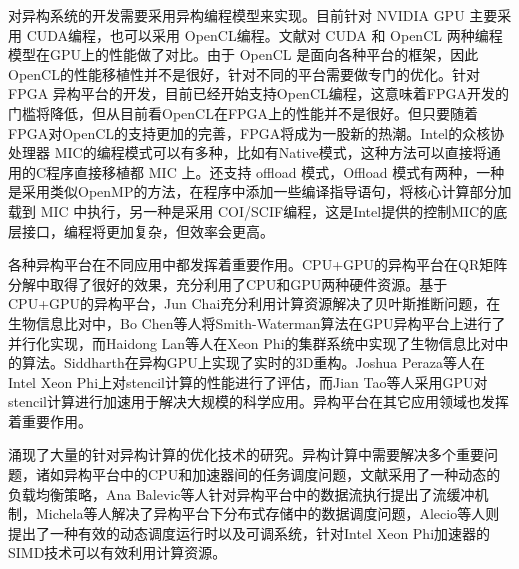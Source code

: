对异构系统的开发需要采用异构编程模型来实现。目前针对 NVIDIA GPU 主要采用 CUDA编程，也可以采用 OpenCL编程。文献对 CUDA 和 OpenCL 两种编程模型在GPU上的性能做了对比。由于 OpenCL 是面向各种平台的框架，因此OpenCL的性能移植性并不是很好，针对不同的平台需要做专门的优化。针对 FPGA 异构平台的开发，目前已经开始支持OpenCL编程，这意味着FPGA开发的门槛将降低，但从目前看OpenCL在FPGA上的性能并不是很好。但只要随着FPGA对OpenCL的支持更加的完善，FPGA将成为一股新的热潮。Intel的众核协处理器 MIC的编程模式可以有多种，比如有Native模式，这种方法可以直接将通用的C程序直接移植都 MIC 上。还支持 offload 模式，Offload 模式有两种，一种是采用类似OpenMP的方法，在程序中添加一些编译指导语句，将核心计算部分加载到 MIC 中执行，另一种是采用 COI/SCIF编程，这是Intel提供的控制MIC的底层接口，编程将更加复杂，但效率会更高。

各种异构平台在不同应用中都发挥着重要作用。CPU+GPU的异构平台在QR矩阵分解中取得了很好的效果，充分利用了CPU和GPU两种硬件资源。基于CPU+GPU的异构平台，Jun Chai充分利用计算资源解决了贝叶斯推断问题，在生物信息比对中，Bo Chen等人将Smith-Waterman算法在GPU异构平台上进行了并行化实现，而Haidong Lan等人在Xeon Phi的集群系统中实现了生物信息比对中的算法。Siddharth在异构GPU上实现了实时的3D重构。Joshua Peraza等人在Intel Xeon Phi上对stencil计算的性能进行了评估，而Jian Tao等人采用GPU对stencil计算进行加速用于解决大规模的科学应用。异构平台在其它应用领域也发挥着重要作用。

涌现了大量的针对异构计算的优化技术的研究。异构计算中需要解决多个重要问题，诸如异构平台中的CPU和加速器间的任务调度问题，文献采用了一种动态的负载均衡策略，Ana Balevic等人针对异构平台中的数据流执行提出了流缓冲机制，Michela等人解决了异构平台下分布式存储中的数据调度问题，Alecio等人则提出了一种有效的动态调度运行时以及可调系统，针对Intel Xeon Phi加速器的SIMD技术可以有效利用计算资源。

